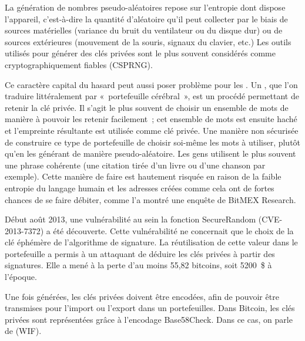 La génération de nombres pseudo-aléatoires repose sur l'entropie dont dispose l'appareil, c'est-à-dire la quantité d'aléatoire qu'il peut collecter par le biais de sources matérielles (variance du bruit du ventilateur ou du disque dur) ou de sources extérieures (mouvement de la souris, signaux du clavier, etc.) Les outils utilisés pour générer des clés privées sont le plus souvent considérés comme cryptographiquement fiables (CSPRNG).

Ce caractère capital du hasard peut aussi poser problème pour les . Un , que l'on traduire littéralement par «~portefeuille cérébral~», est un procédé permettant de retenir la clé privée. Il s'agit le plus souvent de choisir un ensemble de mots de manière à pouvoir les retenir facilement~; cet ensemble de mots est ensuite haché et l'empreinte résultante est utilisée comme clé privée. Une manière non sécurisée de construire ce type de portefeuille de choisir soi-même les mots à utiliser, plutôt qu'en les générant de manière pseudo-aléatoire. Les gens utilisent le plus souvent une phrase cohérente (une citation tirée d'un livre ou d'une chanson par exemple).  Cette manière de faire est hautement risquée en raison de la faible entropie du langage humain et les adresses créées comme cela ont de fortes chances de se faire débiter, comme l'a montré une enquête de BitMEX Research.

Début août 2013, une vulnérabilité au sein la fonction SecureRandom (CVE-2013-7372) a été découverte. Cette vulnérabilité ne concernait que le choix de la clé éphémère de l'algorithme de signature. La réutilisation de cette valeur dans le portefeuille a permis à un attaquant de déduire les clés privées à partir des signatures. Elle a mené à la perte d'au moins 55,82 bitcoins, soit 5200~\$ à l'époque.


Une fois générées, les clés privées doivent être encodées, afin de pouvoir être transmises pour l'import ou l'export dans un portefeuilles. Dans Bitcoin, les clés privées sont représentées grâce à l'encodage Base58Check. Dans ce cas, on parle de  (WIF).

